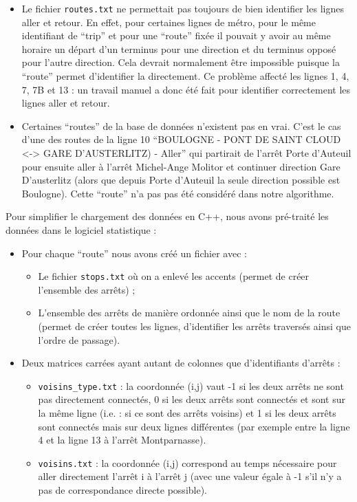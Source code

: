 \documentclass[,french]{article}
\begin{document}
\begin{itemize}
\item
  Le fichier \texttt{routes.txt} ne permettait pas toujours de bien
  identifier les lignes aller et retour. En effet, pour certaines lignes
  de métro, pour le même identifiant de ``trip'' et pour une ``route''
  fixée il pouvait y avoir au même horaire un départ d'un terminus pour
  une direction et du terminus opposé pour l'autre direction. Cela
  devrait normalement être impossible puisque la ``route'' permet
  d'identifier la directement. Ce problème affecté les lignes 1, 4, 7,
  7B et 13 : un travail manuel a donc été fait pour identifier
  correctement les lignes aller et retour.
\item
  Certaines ``routes'' de la base de données n'existent pas en vrai.
  C'est le cas d'une des routes de la ligne 10 ``BOULOGNE - PONT DE
  SAINT CLOUD \textless{}-\textgreater{} GARE D'AUSTERLITZ) - Aller''
  qui partirait de l'arrêt Porte d'Auteuil pour ensuite aller à l'arrêt
  Michel-Ange Molitor et continuer direction Gare D'austerlitz (alors
  que depuis Porte d'Auteuil la seule direction possible est Boulogne).
  Cette ``route'' n'a pas pas été considéré dans notre algorithme.
\end{itemize}

Pour simplifier le chargement des données en C++, nous avons pré-traité
les données dans le logiciel statistique \faRProject :

\begin{itemize}
\item
  Pour chaque ``route'' nous avons créé un fichier avec :

  \begin{itemize}
  \item
    Le fichier \texttt{stops.txt} où on a enlevé les accents (permet de
    créer l'ensemble des arrêts) ;
  \item
    L'ensemble des arrêts de manière ordonnée ainsi que le nom de la
    route (permet de créer toutes les lignes, d'identifier les arrêts
    traversés ainsi que l'ordre de passage).
  \end{itemize}
\item
  Deux matrices carrées ayant autant de colonnes que d'identifiants
  d'arrêts :

  \begin{itemize}
  \item
    \texttt{voisins\_type.txt} : la coordonnée (i,j) vaut -1 si les deux
    arrêts ne sont pas directement connectés, 0 si les deux arrêts sont
    connectés et sont sur la même ligne (i.e. : si ce sont des arrêts
    voisins) et 1 si les deux arrêts sont connectés mais sur deux lignes
    différentes (par exemple entre la ligne 4 et la ligne 13 à l'arrêt
    Montparnasse).
  \item
    \texttt{voisins.txt} : la coordonnée (i,j) correspond au temps
    nécessaire pour aller directement l'arrêt i à l'arrêt j (avec une
    valeur égale à -1 s'il n'y a pas de correspondance directe
    possible).
  \end{itemize}
\end{itemize}
\end{document}
